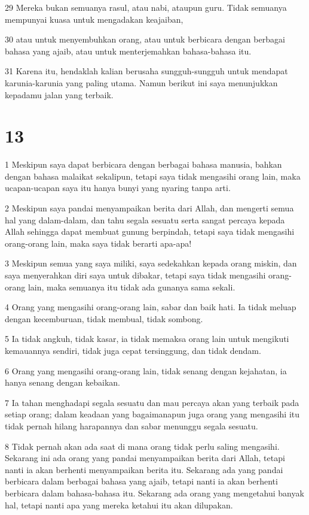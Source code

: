 \par 29 Mereka bukan semuanya rasul, atau nabi, ataupun guru. Tidak semuanya mempunyai kuasa untuk mengadakan keajaiban,
\par 30 atau untuk menyembuhkan orang, atau untuk berbicara dengan berbagai bahasa yang ajaib, atau untuk menterjemahkan bahasa-bahasa itu.
\par 31 Karena itu, hendaklah kalian berusaha sungguh-sungguh untuk mendapat karunia-karunia yang paling utama. Namun berikut ini saya menunjukkan kepadamu jalan yang terbaik.

\chapter{13}

\par 1 Meskipun saya dapat berbicara dengan berbagai bahasa manusia, bahkan dengan bahasa malaikat sekalipun, tetapi saya tidak mengasihi orang lain, maka ucapan-ucapan saya itu hanya bunyi yang nyaring tanpa arti.
\par 2 Meskipun saya pandai menyampaikan berita dari Allah, dan mengerti semua hal yang dalam-dalam, dan tahu segala sesuatu serta sangat percaya kepada Allah sehingga dapat membuat gunung berpindah, tetapi saya tidak mengasihi orang-orang lain, maka saya tidak berarti apa-apa!
\par 3 Meskipun semua yang saya miliki, saya sedekahkan kepada orang miskin, dan saya menyerahkan diri saya untuk dibakar, tetapi saya tidak mengasihi orang-orang lain, maka semuanya itu tidak ada gunanya sama sekali.
\par 4 Orang yang mengasihi orang-orang lain, sabar dan baik hati. Ia tidak meluap dengan kecemburuan, tidak membual, tidak sombong.
\par 5 Ia tidak angkuh, tidak kasar, ia tidak memaksa orang lain untuk mengikuti kemauannya sendiri, tidak juga cepat tersinggung, dan tidak dendam.
\par 6 Orang yang mengasihi orang-orang lain, tidak senang dengan kejahatan, ia hanya senang dengan kebaikan.
\par 7 Ia tahan menghadapi segala sesuatu dan mau percaya akan yang terbaik pada setiap orang; dalam keadaan yang bagaimanapun juga orang yang mengasihi itu tidak pernah hilang harapannya dan sabar menunggu segala sesuatu.
\par 8 Tidak pernah akan ada saat di mana orang tidak perlu saling mengasihi. Sekarang ini ada orang yang pandai menyampaikan berita dari Allah, tetapi nanti ia akan berhenti menyampaikan berita itu. Sekarang ada yang pandai berbicara dalam berbagai bahasa yang ajaib, tetapi nanti ia akan berhenti berbicara dalam bahasa-bahasa itu. Sekarang ada orang yang mengetahui banyak hal, tetapi nanti apa yang mereka ketahui itu akan dilupakan.
